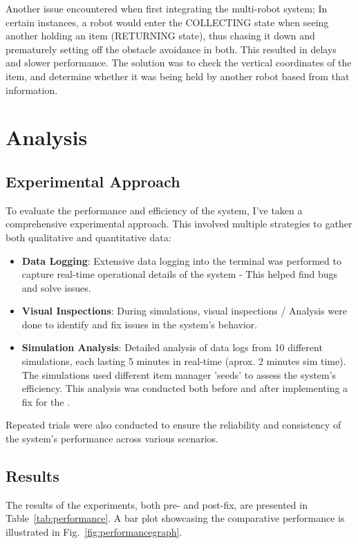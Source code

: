 \documentclass[conference]{IEEEtran}
\begin{document}
Another issue encountered when first integrating the multi-robot system; In certain instances, a robot would enter the COLLECTING state when seeing another holding an item (RETURNING state), thus chasing it down and prematurely setting off the obstacle avoidance in both. This resulted in delays and slower performance. The solution was to check the vertical coordinates of the item, and determine whether it was being held by another robot based from that information.

\section{Analysis}
\subsection{Experimental Approach}

To evaluate the performance and efficiency of the system, I've taken a comprehensive experimental approach. This involved multiple strategies to gather both qualitative and quantitative data:
\begin{itemize}
    \item \textbf{Data Logging}: Extensive data logging into the terminal was performed to capture real-time operational details of the system - This helped find bugs and solve issues.
    \item \textbf{Visual Inspections}: During simulations, visual inspections / Analysis were done to identify and fix issues in the system's behavior.
    \item \textbf{Simulation Analysis}: Detailed analysis of data logs from 10 different simulations, each lasting 5 minutes in real-time (aprox. 2 minutes sim time). The simulations used different item manager 'seeds' to assess the system's efficiency. This analysis was conducted both before and after implementing a fix for the .

\end{itemize}
Repeated trials were also conducted to ensure the reliability and consistency of the system’s performance across various scenarios.


\subsection{Results}
The results of the experiments, both pre- and post-fix, are presented in Table~\ref{tab:performance}. A bar plot showcasing the comparative performance is illustrated in Fig.~\ref{fig:performancegraph}.
\end{document}
